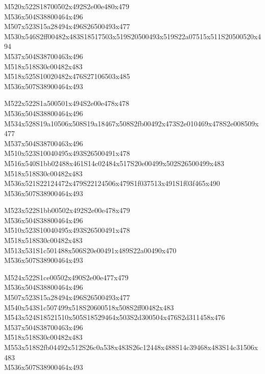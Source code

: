 \documentclass{article}
\begin{document}
\begin{multicols}{5}
\begin{center}

M520x522S18700502x492S2e00e480x479 %
\\M536x504S38800464x496 %
\\M507x523S15a28494x496S26500493x477 %
\\M530x546S2ff00482x483S18517503x519S20500493x519S22a07515x511S20500520x494 %
\\M537x504S38700463x496 %
\\M518x518S30c00482x483 %
\\M518x525S10020482x476S27106503x485 %
\\M536x507S38900464x493 %
\vfil
\columnbreak

M522x522S1a500501x494S2e00e478x478 %
\\M536x504S38800464x496 %
\\M534x528S19a10506x508S19a18467x508S2fb00492x473S2e010469x478S2e008509x477 %
\\M537x504S38700463x496 %
\\M510x523S10040495x493S26500491x478 %
\\M516x540S1bb02488x461S14c02484x517S20e00499x502S26500499x483 %
\\M518x518S30c00482x483 %
\\M536x521S22124472x479S22124506x479S1f037513x491S1f03f465x490 %
\\M536x507S38900464x493 %
\vfil
\columnbreak

M523x522S1bb00502x492S2e00e478x479 %
\\M536x504S38800464x496 %
\\M510x523S10040495x493S26500491x478 %
\\M518x518S30c00482x483 %
\\M513x531S1c501488x506S20e00491x489S22a00490x470 %
\\M536x507S38900464x493 %
\vfil
\columnbreak

M524x522S1ce00502x490S2e00e477x479 %
\\M536x504S38800464x496 %
\\M507x523S15a28494x496S26500493x477 %
\\M540x543S1c507499x518S20600518x508S2ff00482x483 %
\\M543x524S18521510x505S18529464x503S2d300504x476S2d311458x476 %
\\M537x504S38700463x496 %
\\M518x518S30c00482x483 %
\\M553x518S2fb04492x512S26c0a538x483S26c12448x488S14c39468x483S14c31506x483 %
\\M536x507S38900464x493 %
\vfil
\columnbreak


\end{center}
\end{multicols}
\end{document}
